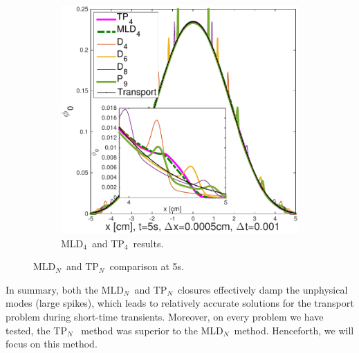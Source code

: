 \documentclass[review]{elsarticle}
\newcommand{\pn}{P$_N$}
\newcommand{\dn}{D$_N$}
\begin{document}
\begin{figure}[ht!]
\begin{subfigure}{.5\textwidth}
		\includegraphics[width=1.\linewidth]{fl5_comp_5s.pdf}
		\caption{MLD$_4$\ and TP$_4$\ results.}
		\label{f:flml5}
	\end{subfigure}
	\caption{ML\dn\ and T\pn\ comparison at 5s.}
	\label{mlfls2}
\end{figure}
In summary, both the ML\dn~and T\pn\ closures effectively damp the unphysical modes (large spikes), which leads to relatively accurate solutions for the transport problem during short-time transients. Moreover, on every problem we have tested, the T\pn~ method was superior to the ML\dn~method.  Henceforth, we will focus on this method. 
\end{document}
